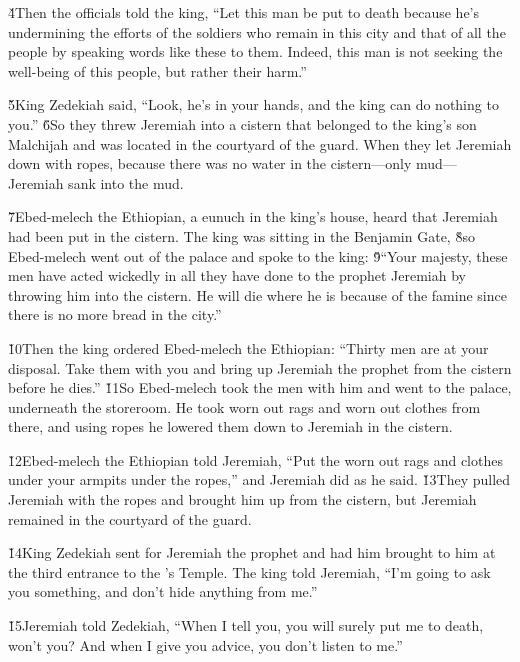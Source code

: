 \v{4}Then the officials told the king, ``Let this man be put to death because he's undermining the efforts of the soldiers who remain in this city and that of all the people by speaking words like these to them. Indeed, this man is not seeking the well-being of this people, but rather their harm.''

\v{5}King Zedekiah said, ``Look, he's in your hands, and the king can do nothing to you.'' \v{6}So they threw Jeremiah into a cistern that belonged to the king's son Malchijah and was located in the courtyard of the guard. When they let Jeremiah down with ropes, because there was no water in the cistern---only mud---Jeremiah sank into the mud.

\v{7}Ebed-melech the Ethiopian, a eunuch in the king's house, heard that Jeremiah had been put in the cistern. The king was sitting in the Benjamin Gate, \v{8}so Ebed-melech went out of the palace and spoke to the king: \v{9}``Your majesty, these men have acted wickedly in all they have done to the prophet Jeremiah by throwing him into the cistern. He will die where he is because of the famine since there is no more bread in the city.''

\v{10}Then the king ordered Ebed-melech the Ethiopian: ``Thirty men are at your disposal. Take them with you and bring up Jeremiah the prophet from the cistern before he dies.'' \v{11}So Ebed-melech took the men with him and went to the palace, underneath the storeroom. He took worn out rags and worn out clothes from there, and using ropes he lowered them down to Jeremiah in the cistern.

\v{12}Ebed-melech the Ethiopian told Jeremiah, ``Put the worn out rags and clothes under your armpits under the ropes,'' and Jeremiah did as he said. \v{13}They pulled Jeremiah with the ropes and brought him up from the cistern, but Jeremiah remained in the courtyard of the guard.

\v{14}King Zedekiah sent for Jeremiah the prophet and had him brought to him at the third entrance to the 's Temple. The king told Jeremiah, ``I'm going to ask you something, and don't hide anything from me.''

\v{15}Jeremiah told Zedekiah, ``When I tell you, you will surely put me to death, won't you? And when I give you advice, you don't listen to me.''

